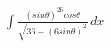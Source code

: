 \documentclass[preview]{standalone}
\begin{document}
\begin{align*}
\int \frac{(sin\theta)^26cos\theta}{\sqrt{36-(6sin\theta)^2}} \, dx
\end{align*}
\end{document}
